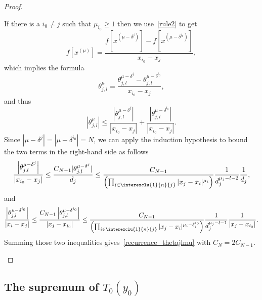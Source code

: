 \begin{proof}
\begin{itemize}
\begin{itemize}
If there is a $i_0\neq j$ such that $\mu_{i_0}\geq 1$ then we use~\eqref{rule2} to get
\[
f\left[x^{(\mu)}\right] = \frac{f\left[x^{(\mu-\delta^j)}\right] - f\left[x^{(\mu-\delta^{i_0})}\right]}{x_{i_0}-x_j},
\]
which implies the formula
\[
\theta_{j,l}^{\mu} = \frac{\theta_{j,l}^{\mu-\delta^j} - \theta_{j,l}^{\mu-\delta^{i_0}}}{x_{i_0}-x_j},
\]
and thus
\[
\left|\theta_{j,l}^{\mu}\right|\leq \frac{\left|\theta_{j,l}^{\mu-\delta^j}\right|}{\left|x_{i_0}-x_j\right|} + \frac{\left|\theta_{j,l}^{\mu-\delta^{i_0}}\right|}{\left|x_{i_0}-x_j\right|}.
\]
Since $|\mu-\delta^j|=|\mu-\delta^{i_0}|=N$, we can apply the induction hypothesis to bound the two terms in the right-hand side as follows
\begin{equation*}
\frac{\left|\theta_{j,l}^{\mu-\delta^j}\right|}{\left|x_{i_0}-x_j\right|} \leq \frac{C_{N-1} |\theta_{j,l}^{\mu-\delta^j}|}{d_j} \leq \frac{C_{N-1}}{\left(\prod_{i\in\interexclu{1}{n}{j}} |x_j-x_i|^{\mu_i}\right)} \frac{1}{d_j^{\mu_j-l-2}} \frac{1}{d_j},
\end{equation*}
and
\begin{equation*}
\frac{\left|\theta_{j,l}^{\mu-\delta^{i_0}}\right|}{\left|x_i-x_j\right|} \leq \frac{C_{N-1} \left|\theta_{j,l}^{\mu-\delta^{i_0}}\right|}{\left|x_j-x_{i_0}\right|}
\leq \frac{C_{N-1}}{\left(\prod_{i\in\interexclu{1}{n}{j}} |x_j-x_i|^{\mu_i-\delta_i^{i_0}}\right)} \frac{1}{d_j^{\mu_j-l-1}} \frac{1}{|x_j-x_{i_0}|}.
\end{equation*}
Summing those two inequalities gives~\eqref{recurrence_thetajlmu} with $C_N=2C_{N-1}$.\qedhere
\end{itemize}
\end{itemize}
\end{proof}



\subsection{The supremum of \texorpdfstring{$T_0(y_0)$}{T0(F0)}} \label{Subsec:Sup_Tmin}


